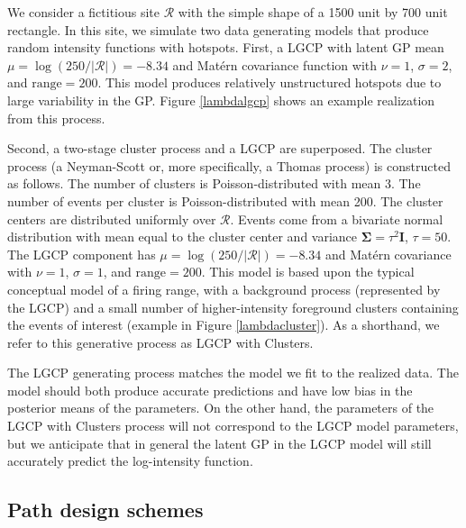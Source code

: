 \documentclass[review]{elsarticle}
\begin{document}
We consider a fictitious site \(\mathcal{R}\) with the simple shape of a 1500
unit by 700 unit rectangle. In this site, we simulate two data generating
models that produce random intensity functions with hotspots. First, a LGCP
with latent GP mean \(\mu = \log(250 / |\mathcal{R}|) = -8.34\) and
Mat\'{e}rn covariance function with \(\nu = 1\), \(\sigma = 2\), and
\(\text{range} = 200\). This model produces relatively unstructured hotspots
due to large variability in the GP. Figure \ref{lambdalgcp} shows an example
realization from this process.

Second, a two-stage cluster process and a LGCP are superposed. The cluster
process (a Neyman-Scott or, more specifically, a Thomas process) is constructed
as follows. The number of clusters is Poisson-distributed with mean 3. The
number of events per cluster is Poisson-distributed with mean 200. The cluster
centers are distributed uniformly over \(\mathcal{R}\). Events come from a
bivariate normal distribution with mean equal to the cluster center and
variance \(\boldsymbol{\Sigma} = \tau^{2}\mathbf{I}\), \(\tau = 50\). The LGCP
component has \(\mu = \log(250 / |\mathcal{R}|) = -8.34\) and Mat\'{e}rn
covariance with \(\nu = 1\), \(\sigma = 1\), and \(\text{range} = 200\). This
model is based upon the typical conceptual model of a firing range, with a
background process (represented by the LGCP) and a small number of
higher-intensity foreground clusters containing the events of interest
(example in Figure \ref{lambdacluster}). As a shorthand, we refer to this
generative process as LGCP with Clusters.

The LGCP generating process matches the model we fit to the realized data. The
model should both produce accurate predictions and have low bias in the
posterior means of the parameters. On the other hand, the parameters of the
LGCP with Clusters process will not correspond to the LGCP model parameters,
but we anticipate that in general the latent GP in the LGCP model will still
accurately predict the log-intensity function.


\subsection{Path design schemes}
\end{document}
